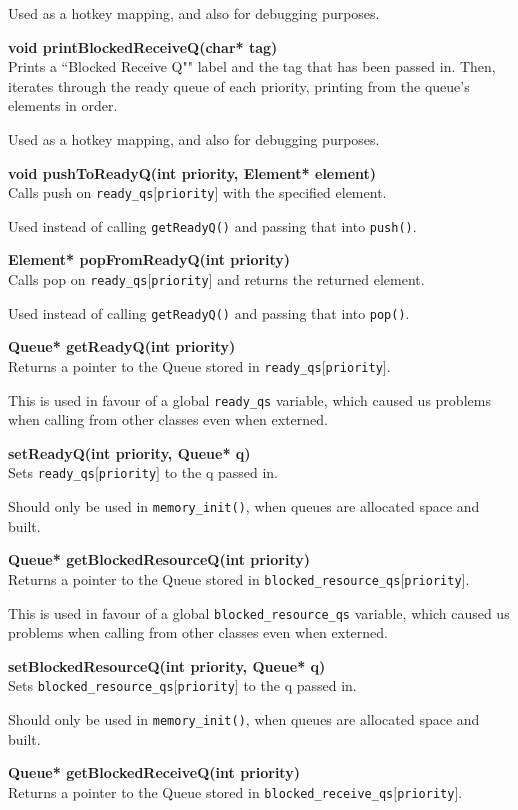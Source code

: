 \documentclass[11pt, oneside]{article}
\begin{document}
Used as a hotkey mapping, and also for debugging purposes.

{\bf void printBlockedReceiveQ(char* tag)}\\
Prints a ``Blocked Receive Q"" label and the tag that has been passed in. Then, iterates through the ready queue of each priority, printing from the queue's elements in order.

Used as a hotkey mapping, and also for debugging purposes.

{\bf void pushToReadyQ(int priority, Element* element)}\\
Calls push on {\tt ready\_qs$[$priority$]$} with the specified element.

Used instead of calling {\tt getReadyQ()} and passing that into {\tt push()}.

{\bf Element* popFromReadyQ(int priority)}\\
Calls pop on {\tt ready\_qs$[$priority$]$} and returns the returned element.

Used instead of calling {\tt getReadyQ()} and passing that into {\tt pop()}.

{\bf Queue* getReadyQ(int priority)}\\
Returns a pointer to the Queue stored in {\tt ready\_qs$[$priority$]$}.

This is used in favour of a global {\tt ready\_qs} variable, which caused us problems when calling from other classes even when externed.

{\bf setReadyQ(int priority, Queue* q)}\\
Sets {\tt ready\_qs$[$priority$]$} to the q passed in.

Should only be used in {\tt memory\_init()}, when queues are allocated space and built.

{\bf Queue* getBlockedResourceQ(int priority)}\\
Returns a pointer to the Queue stored in {\tt blocked\_resource\_qs$[$priority$]$}.

This is used in favour of a global {\tt blocked\_resource\_qs} variable, which caused us problems when calling from other classes even when externed.

{\bf setBlockedResourceQ(int priority, Queue* q)}\\
Sets {\tt blocked\_resource\_qs$[$priority$]$} to the q passed in.

Should only be used in {\tt memory\_init()}, when queues are allocated space and built.

{\bf Queue* getBlockedReceiveQ(int priority)}\\
Returns a pointer to the Queue stored in {\tt blocked\_receive\_qs$[$priority$]$}.
\end{document}
